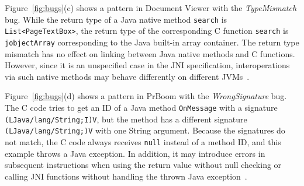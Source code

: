 Figure~\ref{fig:bugs}(c) shows a pattern in Document Viewer with the {\it TypeMismatch} bug.
While the return type of a Java native method {\tt search}
is {\tt List<PageTextBox>}, the return type of the corresponding C function
{\tt search} is {\tt jobjectArray} corresponding to the Java built-in array
container. The return type mismatch has no effect on linking between
Java native methods and C functions. However, since it is an unspecified case in
the JNI specification, interoperations via such native methods may behave
differently on different JVMs~\cite{LeeASE20}. 


Figure~\ref{fig:bugs}(d) shows a pattern in PrBoom with the {\it WrongSignature} bug.
The C code tries to get an ID of a Java method {\tt OnMessage} with a
signature \texttt{(LJava/lang/String;I)V}, but the method has a different
signature \texttt{(LJava/lang/String;)V} with one String argument. Because
the signatures do not match, the C code always receives {\tt null}
instead of a method ID, and this example throws a Java exception. In
addition, it may introduce errors in subsequent instructions when using the
return value without null checking or calling JNI functions without handling the
thrown Java exception~\cite{jniexcept}.
